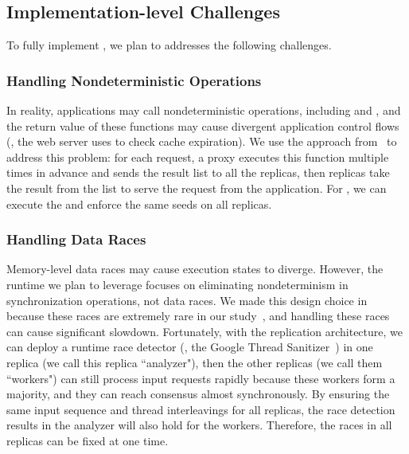 \subsection{Implementation-level Challenges} \label{sec:rep-impl}
To fully implement \crane, we plan to addresses the following challenges.

\subsubsection{Handling Nondeterministic Operations} \label{sec:rep-nondet}
In reality, applications may call nondeterministic operations, including
\randfunc and \gettimeofday, and the return value of these functions may cause
divergent application control flows (\eg, the \apache web server uses
\gettimeofday to check cache expiration). We use the approach
from~\cite{paxos:practical} to address this problem: for each request, a \crane
proxy executes this function multiple times in advance and sends the result list
to all the replicas, then replicas take the result from the list to serve the
request from the application. For \randfunc, we can execute the \srandfunc and
enforce the same seeds on all replicas.

\subsubsection{Handling Data Races} \label{sec:rep-resource}
Memory-level data races may cause execution states to diverge. However, the
\parrot \smt runtime we plan to leverage focuses on eliminating nondeterminism
in synchronization operations, not data races. We made this design choice in
\parrot because these races are extremely rare in our
study~\cite{peregrine:sosp11}, and handling these races can cause significant
slowdown. Fortunately, with the \crane replication architecture, we can deploy a
runtime race detector (\eg, the Google Thread
Sanitizer~\cite{google-thread-sanitizer}) in one replica (we call this replica
``analyzer"), then the other replicas (we call them ``workers") can still
process input requests rapidly because these workers form a majority, and they
can reach consensus almost synchronously. By ensuring the same input sequence
and thread interleavings for all replicas, the race detection results in the
analyzer will also hold for the workers. Therefore, the races in all replicas
can be fixed at one time.




